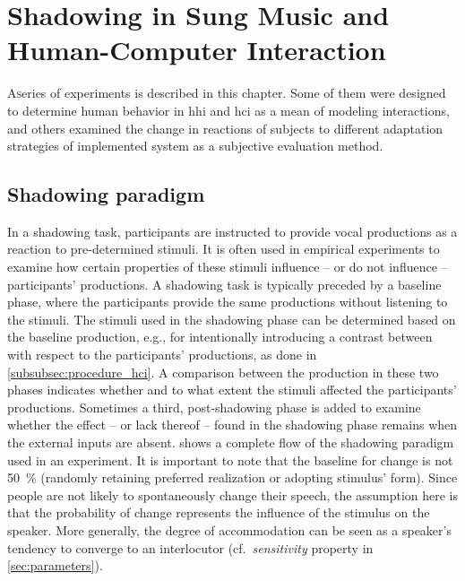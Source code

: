 \chapter{Shadowing in Sung Music and Human-Computer Interaction}
\label{chap:shadowing_in_sung_music_and_human_computer_interaction}

\lettrine{A} series of experiments is described in this chapter.
Some of them were designed to determine human behavior in \acl{hhi} and \ac{hci} as a mean of modeling interactions, and others examined the change in reactions of subjects to different adaptation strategies of implemented system as a subjective evaluation method.

\pagebreak

\section{Shadowing paradigm}
\label{sec:shadowing_paradigm}

In a shadowing task, participants are instructed to provide vocal productions as a reaction to pre-determined stimuli.
It is often used in empirical experiments \citep[e.g.,][]{Goldinger1998echoes} to examine how certain properties of these stimuli influence -- or do not influence -- participants' productions.
A shadowing task is typically preceded by a baseline phase, where the participants provide the same productions without listening to the stimuli.
The stimuli used in the shadowing phase can be determined based on the baseline production, e.g., for intentionally introducing a contrast between with respect to the participants' productions, as done in \cref{subsubsec:procedure_hci}.
A comparison between the production in these two phases indicates whether and to what extent the stimuli affected the participants' productions.
Sometimes a third, post-shadowing phase is added to examine whether the effect -- or lack thereof -- found in the shadowing phase remains when the external inputs are absent.
 shows a complete flow of the shadowing paradigm used in an experiment.
It is important to note that the baseline for change is not \SI{50}{\percent} (randomly retaining preferred realization or adopting stimulus' form).
Since people are not likely to spontaneously change their speech, the assumption here is that the probability of change represents the influence of the stimulus on the speaker.
More generally, the degree of accommodation can be seen as a speaker's tendency to converge to an interlocutor (cf.\ \emph{sensitivity} property in \cref{sec:parameters}).

